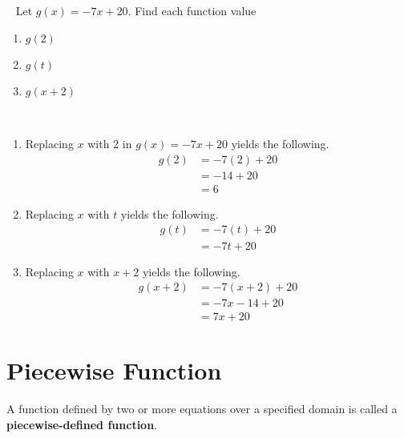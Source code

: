 \documentclass[11pt,fleqn,openany]{book} %
\begin{document}
    \begin{example}~\newline
        Let $g(x)=-7x+20$. Find each function value
        \begin{enumerate}
            \item $g(2)$
            \item $g(t)$
            \item $g(x+2)$\\
        \end{enumerate} 
        \begin{solution}~\newline
            \begin{enumerate}
                \item  Replacing $x$ with 2 in $g(x)=-7x+20$ yields the following.
                \begin{align}
                   g(2)&= -7(2) + 20\\
                   &= -14+20\\
                   &= 6
               \end{align}
               \item  Replacing $x$ with $t$ yields the following.
               \begin{align}
                  g(t)&= -7(t) + 20\\
                  &= -7t+20
              \end{align}
              \item  Replacing $x$ with $x+2$ yields the following.
              \begin{align}
                 g(x+2)&= -7(x+2) + 20\\
                 &= -7x-14+20\\
                 &=7x+20
             \end{align}
             \end{enumerate}    
        \end{solution}
    \end{example}

    \section{Piecewise Function}
    A function defined by two or more equations over a specified 
    domain is called a \textbf{piecewise-defined function}.\\
\end{document}
